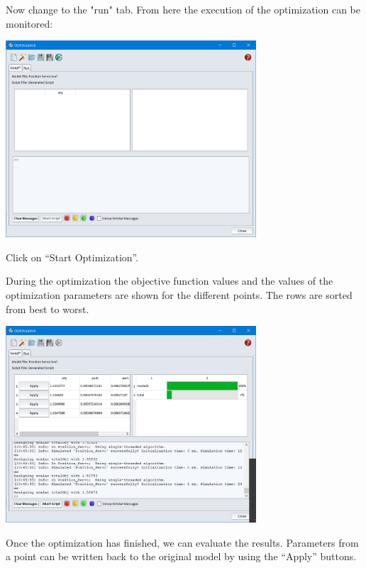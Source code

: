 \documentclass[a4paper,pdftex]{article}
\begin{document}
\begin{tutenumerate}
Now change to the "run" tab. From here the execution of the optimization can be monitored:

\begin{center}
\includegraphics[width=0.7\textwidth]{gfx/optimization/screenshot-opt5a.png}
\end{center}

Click on \enquote{Start Optimization}. 


During the optimization the objective function values and the values of the optimization parameters are shown for the different points. The rows are sorted from best to worst. 

\begin{center}
\includegraphics[width=0.7\textwidth]{gfx/optimization/screenshot-opt5b.png}
\end{center}

Once the optimization has finished, we can evaluate the results. Parameters from a point can be written back to the original model by using the \enquote{Apply} buttons. 


\end{tutenumerate}
\end{document}
